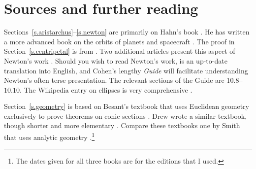 
\section*{Sources and further reading}


Sections~\ref{s.aristarchus}--\ref{s.newton} are primarily on Hahn's book \cite{hahn-cic}. He has written a more advanced book on the orbits of planets and spacecraft \cite{hahn-orbits}. The proof in Section~\ref{s.centripetal} is from \cite{griffiths}. Two additional articles present this aspect of Newton's work \cite{hauser-lang,stein}. Should you wish to read Newton's work, \cite{newton-cohen} is an up-to-date translation into English, and Cohen's lengthy \textit{Guide} will facilitate understanding Newton's often terse presentation. The relevant sections of the Guide are $10.8$--$10.10$. The Wikipedia entry on ellipses is very comprehensive \cite{wiki-ellipse}. 

Section~\ref{s.geometry} is based on Besant's textbook that uses Euclidean geometry exclusively to prove theorems on conic sections \cite{besant}. Drew wrote a similar textbook, though shorter and more elementary \cite{drew}. Compare these textbooks one by Smith that uses analytic geometry \cite{smith}.\footnote{The dates given for all three books are for the editions that I used.}



